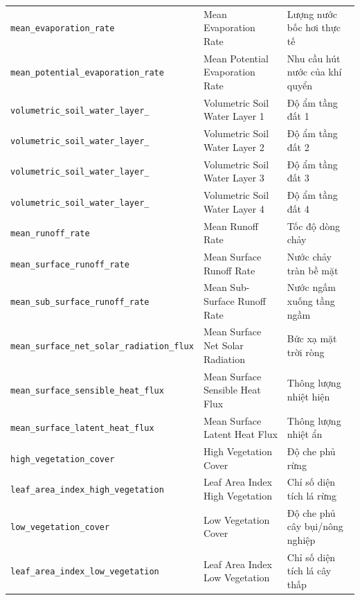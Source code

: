 \documentclass[12pt,a4paper]{article}
\begin{document}
\begin{longtable}{|>{\raggedright\arraybackslash}p{}|>{\raggedright\arraybackslash}p{}|>{\raggedright\arraybackslash}p{}|}
\texttt{mean\_\allowbreak evaporation\_\allowbreak rate} & Mean Evaporation Rate & Lượng nước bốc hơi thực tế \\
\texttt{mean\_\allowbreak potential\_\allowbreak evaporation\_\allowbreak rate} & Mean Potential Evaporation Rate & Nhu cầu hút nước của khí quyển \\
\hline

\texttt{volumetric\_\allowbreak soil\_\allowbreak water\_\allowbreak layer\_\allowbreak 1} & Volumetric Soil Water Layer 1 & Độ ẩm tầng đất 1 \\
\texttt{volumetric\_\allowbreak soil\_\allowbreak water\_\allowbreak layer\_\allowbreak 2} & Volumetric Soil Water Layer 2 & Độ ẩm tầng đất 2 \\
\texttt{volumetric\_\allowbreak soil\_\allowbreak water\_\allowbreak layer\_\allowbreak 3} & Volumetric Soil Water Layer 3 & Độ ẩm tầng đất 3 \\
\texttt{volumetric\_\allowbreak soil\_\allowbreak water\_\allowbreak layer\_\allowbreak 4} & Volumetric Soil Water Layer 4 & Độ ẩm tầng đất 4 \\
\hline

\texttt{mean\_\allowbreak runoff\_\allowbreak rate} & Mean Runoff Rate & Tốc độ dòng chảy \\
\texttt{mean\_\allowbreak surface\_\allowbreak runoff\_\allowbreak rate} & Mean Surface Runoff Rate & Nước chảy tràn bề mặt \\
\texttt{mean\_\allowbreak sub\_\allowbreak surface\_\allowbreak runoff\_\allowbreak rate} & Mean Sub-Surface Runoff Rate & Nước ngấm xuống tầng ngầm \\
\hline

\texttt{mean\_\allowbreak surface\_\allowbreak net\_\allowbreak solar\_\allowbreak radiation\_\allowbreak flux} & Mean Surface Net Solar Radiation & Bức xạ mặt trời ròng \\
\hline

\texttt{mean\_\allowbreak surface\_\allowbreak sensible\_\allowbreak heat\_\allowbreak flux} & Mean Surface Sensible Heat Flux & Thông lượng nhiệt hiện \\
\texttt{mean\_\allowbreak surface\_\allowbreak latent\_\allowbreak heat\_\allowbreak flux} & Mean Surface Latent Heat Flux & Thông lượng nhiệt ẩn \\
\hline

\texttt{high\_\allowbreak vegetation\_\allowbreak cover} & High Vegetation Cover & Độ che phủ rừng \\
\texttt{leaf\_\allowbreak area\_\allowbreak index\_\allowbreak high\_\allowbreak vegetation} & Leaf Area Index High Vegetation & Chỉ số diện tích lá rừng \\
\texttt{low\_\allowbreak vegetation\_\allowbreak cover} & Low Vegetation Cover & Độ che phủ cây bụi/nông nghiệp \\
\texttt{leaf\_\allowbreak area\_\allowbreak index\_\allowbreak low\_\allowbreak vegetation} & Leaf Area Index Low Vegetation & Chỉ số diện tích lá cây thấp \\
\hline


\end{longtable}
\end{document}
